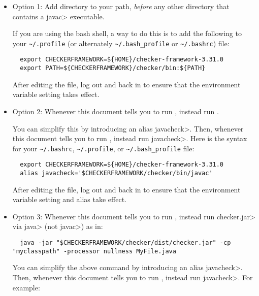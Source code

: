 \begin{itemize}
  \item
    Option 1:
    Add directory
     to your path, \emph{before} any other
    directory that contains a \<javac> executable.

    If you are
    using the bash shell, a way to do this is to add the following to your
    \verb|~/.profile| (or alternately \verb|~/.bash_profile| or \verb|~/.bashrc|) file:
\begin{Verbatim}
  export CHECKERFRAMEWORK=${HOME}/checker-framework-3.31.0
  export PATH=${CHECKERFRAMEWORK}/checker/bin:${PATH}
\end{Verbatim}

   After editing the file, log out and back in to ensure that the environment variable
   setting takes effect.

  \item
    \begin{sloppypar}
    Option 2:
    Whenever this document tells you to run ,
    instead run .
    \end{sloppypar}

    You can simplify this by introducing an alias \<javacheck>.  Then,
    whenever this document tells you to run , instead run
    \<javacheck>.  Here is the syntax for your
    \verb|~/.bashrc|, \verb|~/.profile|, or \verb|~/.bash_profile|
    file:
\begin{Verbatim}
  export CHECKERFRAMEWORK=${HOME}/checker-framework-3.31.0
  alias javacheck='$CHECKERFRAMEWORK/checker/bin/javac'
\end{Verbatim}

   After editing the file, log out and back in to ensure that the environment variable
   setting and alias take effect.

   \item
   Option 3:
   Whenever this document tells you to run , instead
   run \<checker.jar> via \<java> (not \<javac>) as in:

\begin{Verbatim}
  java -jar "$CHECKERFRAMEWORK/checker/dist/checker.jar" -cp "myclasspath" -processor nullness MyFile.java
\end{Verbatim}

    You can simplify the above command by introducing an alias
    \<javacheck>.  Then, whenever this document tells you to run
    , instead run \<javacheck>.  For example:


\end{itemize}
